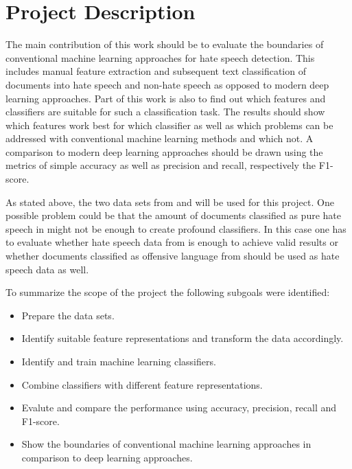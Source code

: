 \section{Project Description}
\label{section:description}

The main contribution of this work should be to evaluate the boundaries of conventional machine learning approaches for hate speech detection. This includes manual feature extraction and subsequent text classification of doc\-u\-ments into hate speech and non-hate speech as opposed to modern deep learning approaches. Part of this work is also to find out which features and classifiers are suitable for such a classification task. The results should show which features work best for which classifier as well as which problems can be addressed with conventional machine learning methods and which not. A comparison to modern deep learning approaches should be drawn using the metrics of simple accuracy as well as precision and recall, respectively the F1-score. 

As stated above, the two data sets from \cite{ThomasDavidson.2020} and \cite{OnadeGibert.2020} will be used for this project. One possible problem could be that the amount of documents classified as pure hate speech in \cite{ThomasDavidson.2020} might not be enough to create profound classifiers. In this case one has to evaluate whether hate speech data from \cite{OnadeGibert.2020} is enough to achieve valid results or whether documents classified as offensive language from \cite{ThomasDavidson.2020} should be used as hate speech data as well. 

\vspace{12pt}
To summarize the scope of the project the following subgoals were iden\-ti\-fied:

\begin{itemize}
	\item Prepare the data sets.
	\item Identify suitable feature representations and transform the data ac\-cord\-ingly.
	\item Identify and train machine learning classifiers.
	\item Combine classifiers with different feature representations.
	\item Evalute and compare the performance using accuracy, precision, recall and F1-score.
	\item Show the boundaries of conventional machine learning approaches in comparison to deep learning approaches.
\end{itemize}

